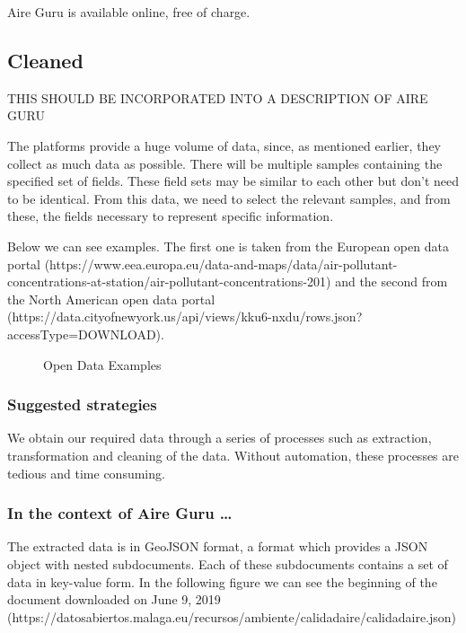 Aire Guru is available online, free of charge.

\subsection*{Cleaned}

THIS SHOULD BE INCORPORATED INTO A DESCRIPTION OF AIRE GURU

The platforms provide a huge volume of data, since, as mentioned earlier, they collect as much data as possible.
There will be multiple samples containing the specified set of fields. These field sets may be similar to each other but don't need to be identical.
From this data, we need to select the relevant samples, and from these, the fields necessary to represent specific information.

Below we can see examples. The first one is taken from the European open data portal
(https://www.eea.europa.eu/data-and-maps/data/air-pollutant-concentrations-at-station/air-pollutant-concentrations-201) and the second from the North American open data portal
(https://data.cityofnewyork.us/api/views/kku6-nxdu/rows.json?accessType=DOWNLOAD).

\begin{figure}[ht]
    \centering
    \hfill
    \caption{Open Data Examples}
\end{figure}
    
\subsubsection*{Suggested strategies}

We obtain our required data through a series of processes such as extraction, transformation and
cleaning of the data. Without automation, these processes are tedious and time consuming. 

\subsubsection*{In the context of Aire Guru \ldots} 

The extracted data is in GeoJSON format, a format which provides a JSON object with nested subdocuments. Each of these
subdocuments contains a set of data in key-value form.
In the following figure we can see the beginning of the document downloaded on June 9, 2019
(https://datosabiertos.malaga.eu/recursos/ambiente/calidadaire/calidadaire.json) \\

